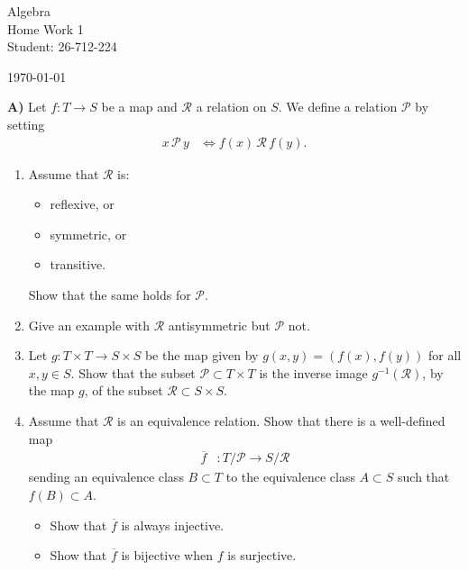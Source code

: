\documentclass[12pt,a4paper]{article}
\begin{document}
\begin{titlepage}
\centering
\vspace*{\fill}
{\Huge Algebra}\\[0.5cm]
{\Huge Home Work 1}\\[1.5cm]
{\Large Student: 26-712-224}\\[0.5cm]
{\Large \today\par}

\vspace{2cm}
\vspace*{\fill}
\end{titlepage}

\noindent\textbf{A)} Let $f:T\to S$ be a map and $\mathcal{R}$ a relation on $S$.
We define a relation $\mathcal{P}$ by setting
\begin{align*}
x\,\mathcal{P}\,y &\iff f(x)\,\mathcal{R}\,f(y).
\end{align*}

\begin{enumerate}
\renewcommand{\labelenumi}{(\arabic{enumi})}

\item Assume that $\mathcal{R}$ is:
\begin{itemize}
\item reflexive, or
\item symmetric, or
\item transitive.
\end{itemize}
Show that the same holds for $\mathcal{P}$.

\item Give an example with $\mathcal{R}$ antisymmetric but $\mathcal{P}$ not.

\item Let $g:T\times T\to S\times S$ be the map given by
$g(x,y)=(f(x),f(y))$ for all $x,y\in S$.
Show that the subset $\mathcal{P}\subset T\times T$ is the inverse image
$g^{-1}(\mathcal{R})$, by the map $g$, of the subset
$\mathcal{R}\subset S\times S$.

\item Assume that $\mathcal{R}$ is an equivalence relation.
Show that there is a well-defined map
\begin{align*}
\overline{f}&:T/\mathcal{P}\to S/\mathcal{R}
\end{align*}
sending an equivalence class $B\subset T$ to the equivalence class
$A\subset S$ such that $f(B)\subset A$.
\begin{itemize}
\item Show that $\overline{f}$ is always injective.
\item Show that $\overline{f}$ is bijective when $f$ is surjective.
\end{itemize}

\end{enumerate}
\end{document}
